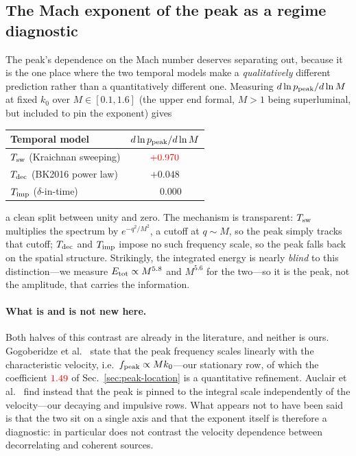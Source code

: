 \documentclass[10pt,prd,aps,nobibnotes,superscriptaddress,preprintnumbers,notitlepage]{revtex4-1}
\newcommand{\add}[1]{{\color{red}#1}}
\newcommand{\add}[1]{#1}
\begin{document}
\subsection{The Mach exponent of the peak as a regime diagnostic}
\label{sec:mach-exponent}

The peak's dependence on the Mach number deserves separating out, because it is
the one place where the two temporal models make a \emph{qualitatively}
different prediction rather than a quantitatively different one. Measuring
$d\ln p_{\rm peak}/d\ln M$ at fixed $k_0$ over $M\in[0.1,1.6]$ (the upper end
formal, $M>1$ being superluminal, but included to pin the exponent) gives
\begin{center}
\begin{tabular}{lc}
\hline
Temporal model & $d\ln p_{\rm peak}/d\ln M$ \\
\hline
$T_{\rm sw}$ (Kraichnan sweeping) & $\add{+0.970}$ \\
$T_{\rm dec}$ (BK2016 power law)  & $+0.048$ \\
$T_{\rm imp}$ ($\delta$-in-time)  & $\phantom{+}0.000$ \\
\hline
\end{tabular}
\end{center}
a clean split between unity and zero. The mechanism is transparent: $T_{\rm sw}$
multiplies the spectrum by $e^{-q^{2}/M^{2}}$, a cutoff at $q\sim M$, so the peak
simply tracks that cutoff; $T_{\rm dec}$ and $T_{\rm imp}$ impose no such
frequency scale, so the peak falls back on the spatial structure. Strikingly,
the integrated energy is nearly \emph{blind} to this distinction---we measure
$E_{\rm tot}\propto M^{5.8}$ and $M^{5.6}$ for the two---so it is the peak, not
the amplitude, that carries the information.

\paragraph{What is and is not new here.} Both halves of this contrast are
already in the literature, and neither is ours. Gogoberidze et al.\
\cite{Gogoberidze:2007an} state that the peak frequency scales linearly with the
characteristic velocity, i.e.\ $f_{\rm peak}\propto Mk_{0}$---our stationary row,
of which the coefficient $\add{1.49}$ of Sec.~\ref{sec:peak-location} is a
quantitative refinement. Auclair et al.\ \cite{Auclair:2022jod} find instead that the
peak is pinned to the integral scale independently of the velocity---our
decaying and impulsive rows. What appears not to have been said is that the two
sit on a single axis and that the exponent itself is therefore a diagnostic:
\cite{Auclair:2022jod} in particular does not contrast the velocity dependence
between decorrelating and coherent sources.
\end{document}
